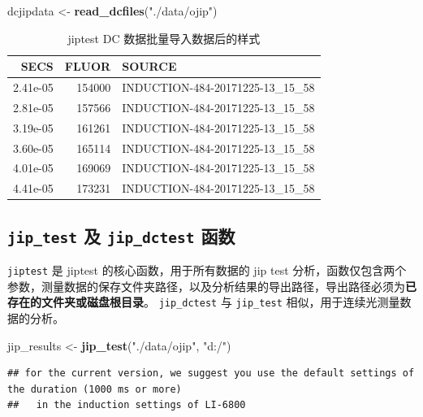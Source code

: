 \documentclass[]{krantz}
\makeatletter
\newenvironment{Shaded}{\begin{snugshade}}{\end{snugshade}}
\newcommand{\KeywordTok}[1]{\textcolor[rgb]{0.13,0.29,0.53}{\textbf{#1}}}
\newcommand{\StringTok}[1]{\textcolor[rgb]{0.31,0.60,0.02}{#1}}
\newcommand{\NormalTok}[1]{#1}
\newenvironment{kframe}{%
\medskip{}
\setlength{\fboxsep}{.8em}
 \def\at@end@of@kframe{}%
 \ifinner\ifhmode%
  \def\at@end@of@kframe{\end{minipage}}%
  \begin{minipage}{\columnwidth}%
 \fi\fi%
 \def\FrameCommand##1{\hskip\@totalleftmargin \hskip-\fboxsep
 \colorbox{shadecolor}{##1}\hskip-\fboxsep
     \hskip-\linewidth \hskip-\@totalleftmargin \hskip\columnwidth}%
 \MakeFramed {\advance\hsize-\width
   \@totalleftmargin\z@ \linewidth\hsize
   \@setminipage}}%
 {\par\unskip\endMakeFramed%
 \at@end@of@kframe}
\renewenvironment{Shaded}{\begin{kframe}}{\end{kframe}}
\theoremstyle{definition}
\theoremstyle{definition}
\theoremstyle{definition}
\theoremstyle{remark}
\makeatother
\begin{document}
\begin{Shaded}
\begin{Highlighting}[]
\NormalTok{dcjipdata <-}\StringTok{ }\KeywordTok{read_dcfiles}\NormalTok{(}\StringTok{"./data/ojip"}\NormalTok{)}
\end{Highlighting}
\end{Shaded}

\begin{table}

\caption{\label{tab:unnamed-chunk-31}jiptest DC 数据批量导入数据后的样式}
\centering
\begin{tabular}[t]{rrl}
\toprule
SECS & FLUOR & SOURCE\\
\midrule
2.41e-05 & 154000 & INDUCTION-484-20171225-13\_15\_58\\
2.81e-05 & 157566 & INDUCTION-484-20171225-13\_15\_58\\
3.19e-05 & 161261 & INDUCTION-484-20171225-13\_15\_58\\
3.60e-05 & 165114 & INDUCTION-484-20171225-13\_15\_58\\
4.01e-05 & 169069 & INDUCTION-484-20171225-13\_15\_58\\
4.41e-05 & 173231 & INDUCTION-484-20171225-13\_15\_58\\
\bottomrule
\end{tabular}
\end{table}

\subsection{\texorpdfstring{\texttt{jip\_test} 及 \texttt{jip\_dctest}
函数}{jip\_test 及 jip\_dctest 函数}}\label{testfluor}

\texttt{jiptest} 是 jiptest 的核心函数，用于所有数据的 jip test
分析，函数仅包含两个参数，测量数据的保存文件夹路径，以及分析结果的导出路径，导出路径必须为\textbf{已存在的文件夹或磁盘根目录}。
\texttt{jip\_dctest} 与 \texttt{jip\_test}
相似，用于连续光测量数据的分析。

\begin{Shaded}
\begin{Highlighting}[]
\NormalTok{jip_results <-}\StringTok{ }\KeywordTok{jip_test}\NormalTok{(}\StringTok{"./data/ojip"}\NormalTok{, }\StringTok{"d:/"}\NormalTok{)}
\end{Highlighting}
\end{Shaded}

\begin{verbatim}
## for the current version, we suggest you use the default settings of the duration (1000 ms or more)
##   in the induction settings of LI-6800
\end{verbatim}
\end{document}
